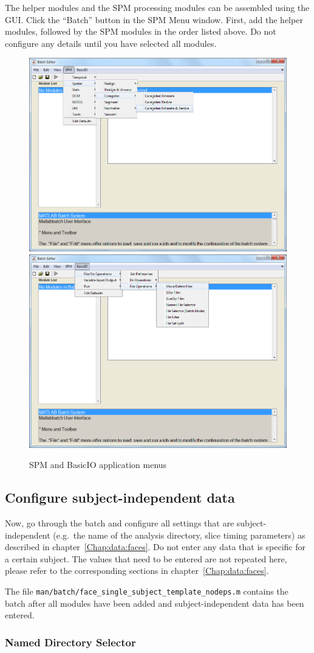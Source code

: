 The helper modules and the SPM processing modules can be assembled using the
GUI. Click the ``Batch'' button in the SPM Menu window. First, add the helper
modules, followed by the SPM modules in the order listed above. Do not configure
any details until you have selected all modules.

\begin{figure}
  \centering
  \includegraphics[width=.49\linewidth]{batch/batch_spm}
  \hfill
  \includegraphics[width=.49\linewidth]{batch/batch_basicio}      
  \caption{SPM and BasicIO application menus}
  \label{fig:basicio_spm}
\end{figure}

\subsection{Configure subject-independent data}

Now, go through the batch and configure all settings that are
subject-independent (e.g.\ the name of the analysis directory, slice timing
parameters) as described in chapter~\ref{Chap:data:faces}. Do not enter any data that
is specific for a certain subject. The values that need to be entered are not
repeated here, please refer to the corresponding sections in
chapter~\ref{Chap:data:faces}.

The file \verb|man/batch/face_single_subject_template_nodeps.m| contains the
batch after all modules have been added and subject-independent data has been
entered.

\subsubsection*{Named Directory Selector}

